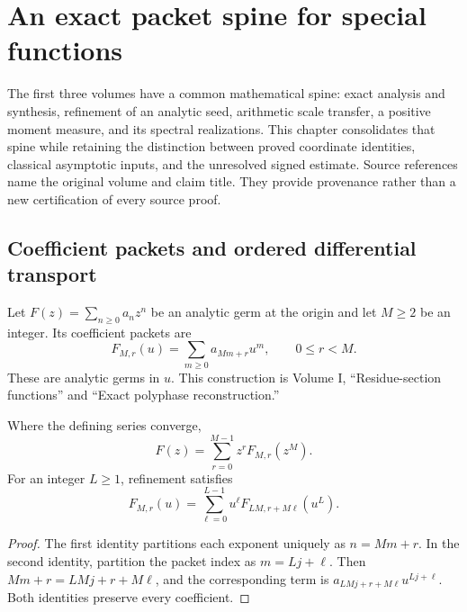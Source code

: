 \chapter{An exact packet spine for special functions}

The first three volumes have a common mathematical spine: exact analysis and synthesis, refinement of an analytic seed, arithmetic scale transfer, a positive moment measure, and its spectral realizations. This chapter consolidates that spine while retaining the distinction between proved coordinate identities, classical asymptotic inputs, and the unresolved signed estimate. Source references name the original volume and claim title. They provide provenance rather than a new certification of every source proof.

\section{Coefficient packets and ordered differential transport}

Let $F(z)=\sum_{n\ge0}a_nz^n$ be an analytic germ at the origin and let $M\ge2$ be an integer. Its coefficient packets are
\[
F_{M,r}(u)=\sum_{m\ge0}a_{Mm+r}u^m,
\qquad 0\le r<M.
\]
These are analytic germs in $u$. This construction is Volume I, ``Residue-section functions'' and ``Exact polyphase reconstruction.''

\begin{proposition}
Where the defining series converge,
\[
F(z)=\sum_{r=0}^{M-1}z^rF_{M,r}(z^M).
\]
For an integer $L\ge1$, refinement satisfies
\[
F_{M,r}(u)=\sum_{\ell=0}^{L-1}u^\ell
F_{LM,r+M\ell}(u^L).
\]
\end{proposition}
\begin{proof}
The first identity partitions each exponent uniquely as $n=Mm+r$. In the second identity, partition the packet index as $m=Lj+\ell$. Then
$Mm+r=LMj+r+M\ell$, and the corresponding term is
$a_{LMj+r+M\ell}u^{Lj+\ell}$. Both identities preserve every coefficient.
\end{proof}

